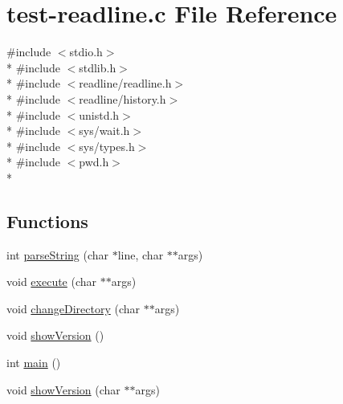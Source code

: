 \hypertarget{test-readline_8c}{\section{test-\/readline.c File Reference}
\label{test-readline_8c}
}
{\ttfamily \#include $<$stdio.\-h$>$}\\*
{\ttfamily \#include $<$stdlib.\-h$>$}\\*
{\ttfamily \#include $<$readline/readline.\-h$>$}\\*
{\ttfamily \#include $<$readline/history.\-h$>$}\\*
{\ttfamily \#include $<$unistd.\-h$>$}\\*
{\ttfamily \#include $<$sys/wait.\-h$>$}\\*
{\ttfamily \#include $<$sys/types.\-h$>$}\\*
{\ttfamily \#include $<$pwd.\-h$>$}\\*
\subsection*{Functions}
\begin{DoxyCompactItemize}
\item 
int \hyperlink{test-readline_8c_aff6b0a41d77813d74646a7ba589a6ddf}{parse\-String} (char $\ast$line, char $\ast$$\ast$args)
\item 
void \hyperlink{test-readline_8c_a3f7275b5b7bf89cc52d9600c92deb608}{execute} (char $\ast$$\ast$args)
\item 
void \hyperlink{test-readline_8c_a24d106a1954c3e411214e2a1f6d64502}{change\-Directory} (char $\ast$$\ast$args)
\item 
void \hyperlink{test-readline_8c_a2de507730a8ffeaa8ef728c753eecbfb}{show\-Version} ()
\item 
int \hyperlink{test-readline_8c_ae66f6b31b5ad750f1fe042a706a4e3d4}{main} ()
\item 
void \hyperlink{test-readline_8c_ab08926a37cacb56d27f6d1acbfb197c5}{show\-Version} (char $\ast$$\ast$args)
\end{DoxyCompactItemize}


